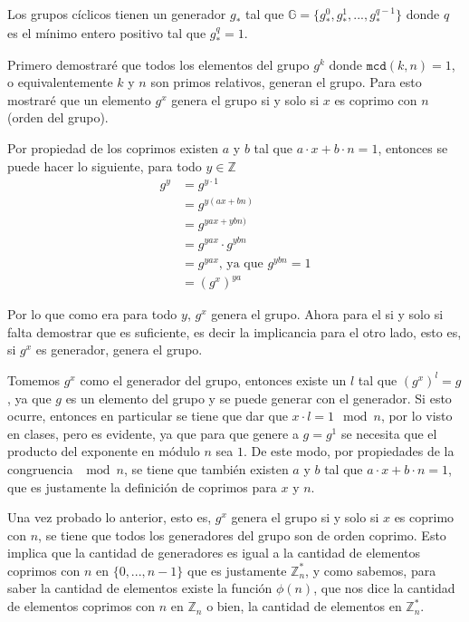 \documentclass[twoside]{tareas}
\begin{document}
\begin{enumerate}
    Los grupos cíclicos tienen un generador $g_*$ tal que $\mathbb{G} = \{g^0_*, g^1_*, ..., g^{q-1}_*\}$ donde $q$ es el mínimo entero positivo tal que $g^q_* = 1$.


    Primero demostraré que todos los elementos del grupo $g^k$ donde $\texttt{mcd}(k, n) = 1$, o equivalentemente $k$ y $n$ son primos relativos, generan el grupo. Para esto mostraré que un elemento $g^x$ genera el grupo si y solo si $x$ es coprimo con $n$ (orden del grupo).

    Por propiedad de los coprimos existen $a$ y $b$ tal que $a\cdot x + b\cdot n = 1$, entonces se puede hacer lo siguiente, para todo $y \in \mathbb{Z}$
    \begin{align*}
        g^y &= g^{y \cdot 1}\\
        &=g^{y(ax + bn)}\\
        &=g^{yax + ybn)}\\
        &=g^{yax}\cdot g^{ybn}\\
        &=g^{yax}\text{,  ya que } g^{ybn} = 1\\
        &=(g^x)^{ya}
    \end{align*}

    Por lo que como era para todo $y$, $g^x$ genera el grupo. Ahora para el si y solo si falta demostrar que es suficiente, es decir la implicancia para el otro lado, esto es, si $g^x$ es generador, genera el grupo.

    Tomemos $g^x$ como el generador del grupo, entonces existe un $l$ tal que $(g^x)^l = g$, ya que $g$ es un elemento del grupo y se puede generar con el generador. Si esto ocurre, entonces en particular se tiene que dar que $x\cdot l = 1 \mod n$, por lo visto en clases, pero es evidente, ya que para que genere a $g = g^1$ se necesita que el producto del exponente en módulo $n$ sea $1$. De este modo, por propiedades de la congruencia $\mod n$, se tiene que también existen $a$ y $b$ tal que $a\cdot x + b\cdot n = 1$, que es justamente la definición de coprimos para $x$ y $n$.

    Una vez probado lo anterior, esto es, $g^x$ genera el grupo si y solo si $x$ es coprimo con $n$, se tiene que todos los generadores del grupo son de orden coprimo. Esto implica que la cantidad de generadores es igual a la cantidad de elementos coprimos con $n$ en $\{0,...,n-1\}$ que es justamente $\mathbb{Z}_n^*$, y como sabemos, para saber la cantidad de elementos existe la función $\phi(n)$, que nos dice la cantidad de elementos coprimos con $n$ en $\mathbb{Z}_n$ o bien, la cantidad de elementos en $\mathbb{Z}_n^*$.


\end{enumerate}
\end{document}

